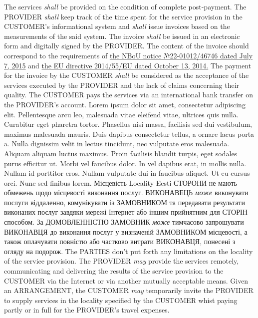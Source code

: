\begin{Form}
\begin{paracol}{3}
        {The services \textit{shall} be provided on the condition of complete post-payment. The PROVIDER \textit{shall} keep track of the time spent for the service provision in the CUSTOMER's informational system and \textit{shall} issue invoices based on the measurements of the said system. The invoice \textit{shall} be issued in an electronic form and digitally signed by the PROVIDER. The content of the invoice should correspond to the requirements of \href{http://bank.gov.ua/doccatalog/document?id=19208488}{the NBoU notice №22-01012/46746 dated July 7, 2015} and  \href{http://eur-lex.europa.eu/legal-content/EN/TXT/?uri=CELEX:32014L0055}{the EU directive 2014/55/EU dated October 13, 2014.} The payment for the invoice by the CUSTOMER \textit{shall} be considered as the acceptance of the services executed by the PROVIDER and the lack of claims concerning their quality. The CUSTOMER pays the services via an international bank transfer on the PROVIDER's account.}
        {Lorem ipsum dolor sit amet, consectetur adipiscing elit. Pellentesque arcu leo, malesuada vitae eleifend vitae, ultrices quis nulla. Curabitur eget pharetra tortor. Phasellus nisi massa, facilisis sed dui vestibulum, maximus malesuada mauris. Duis dapibus consectetur tellus, a ornare lacus porta a. Nulla dignissim velit in lectus tincidunt, nec vulputate eros malesuada. Aliquam aliquam luctus maximus. Proin facilisis blandit turpis, eget sodales purus efficitur ut. Morbi vel faucibus dolor. In vel dapibus erat, in mollis nulla. Nullam id porttitor eros. Nullam vulputate dui in faucibus aliquet. Ut eu cursus orci. Nunc sed finibus lorem.}
      \clause
        {Місцевість}
        {Locality}
        {Eesti}
        {СТОРОНИ не мають обмежень щодо місцевості виконання послуг. ВИКОНАВЕЦЬ \textit{може} виконувати послуги віддаленно, комунікувати із ЗАМОВНИКОМ та передавати результати виконаних послуг завдяки мережі Інтернет або іншим прийнятним для СТОРІН способом. За ДОМОВЛЕННІСТЮ ЗАМОВНИК \textit{може} тимчасово запрошувати ВИКОНАВЦЯ до виконання послуг у визначеній ЗАМОВНИКОМ місцевості, а також оплачувати повністю або частково витрати ВИКОНАВЦЯ, понесені з огляду на подорож.}
        {The PARTIES don't put forth any limitations on the locality of the service provision. The PROVIDER \textit{may} provide the services remotely, communicating and delivering the results of the service provision to the CUSTOMER via the Internet or via another mutually acceptable means. Given an ARRANGEMENT, the CUSTOMER \textit{may} temporarily invite the PROVIDER to supply services in the locality specified by the CUSTOMER whist paying partly or in full for the PROVIDER's travel expenses.}

\end{paracol}
\end{Form}
